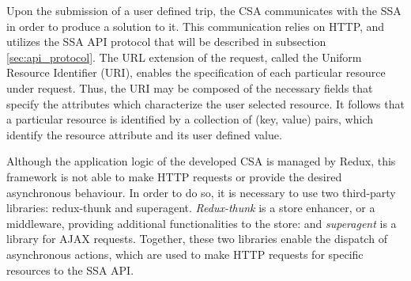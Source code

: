 Upon the submission of a user defined trip, the CSA communicates with the SSA in order to produce a solution to it. This communication relies on HTTP, and utilizes the SSA API protocol that will be described in subsection \ref{sec:api_protocol}. The URL extension of the request, called the Uniform Resource Identifier (URI), enables the specification of each particular resource under request. Thus, the URI may be composed of the necessary fields that specify the attributes which characterize the user selected resource. It follows that a particular resource is identified by a collection of (key, value) pairs, which identify the resource attribute and its user defined value.

Although the application logic of the developed CSA is managed by Redux, this framework is not able to make HTTP requests or provide the desired asynchronous behaviour. In order to do so, it is necessary to use two third-party  libraries: redux-thunk and superagent. \textit{Redux-thunk} is a store enhancer, or a middleware, providing additional functionalities to the store: and \textit{superagent} is a library for \ac{AJAX} requests. Together, these two libraries enable the dispatch of asynchronous actions, which are used to make HTTP requests for specific resources to the SSA API.




